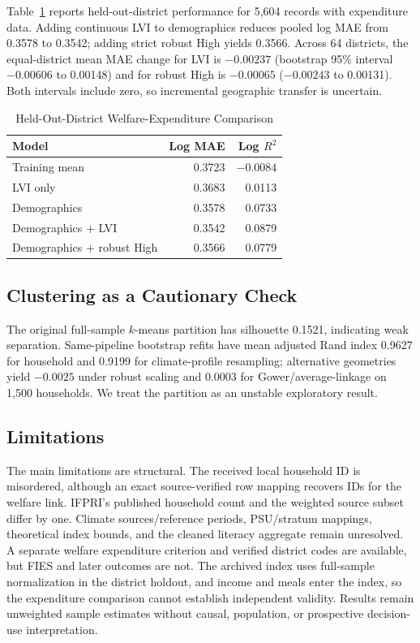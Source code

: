 \documentclass[conference,a4paper]{IEEEtran}
\begin{document}
Table~\ref{tab:welfare} reports held-out-district performance for 5,604 records with expenditure data. Adding continuous LVI to demographics reduces pooled log MAE from 0.3578 to 0.3542; adding strict robust High yields 0.3566. Across 64 districts, the equal-district mean MAE change for LVI is $-0.00237$ (bootstrap 95\% interval $-0.00606$ to 0.00148) and for robust High is $-0.00065$ ($-0.00243$ to 0.00131). Both intervals include zero, so incremental geographic transfer is uncertain.

\begin{table}[t]
\caption{Held-Out-District Welfare-Expenditure Comparison}
\label{tab:welfare}
\centering
\begin{tabular}{lrr}
\toprule
Model & Log MAE & Log $R^2$\\
\midrule
Training mean & 0.3723 & $-0.0084$\\
LVI only & 0.3683 & 0.0113\\
Demographics & 0.3578 & 0.0733\\
Demographics + LVI & 0.3542 & 0.0879\\
Demographics + robust High & 0.3566 & 0.0779\\
\bottomrule
\end{tabular}
\end{table}

\subsection{Clustering as a Cautionary Check}
The original full-sample $k$-means partition has silhouette 0.1521, indicating weak separation. Same-pipeline bootstrap refits have mean adjusted Rand index 0.9627 for household and 0.9199 for climate-profile resampling; alternative geometries yield $-0.0025$ under robust scaling and 0.0003 for Gower/average-linkage on 1,500 households. We treat the partition as an unstable exploratory result.

\subsection{Limitations}
The main limitations are structural. The received local household ID is misordered, although an exact source-verified row mapping recovers IDs for the welfare link. IFPRI's published household count and the weighted source subset differ by one. Climate sources/reference periods, PSU/stratum mappings, theoretical index bounds, and the cleaned literacy aggregate remain unresolved. A separate welfare expenditure criterion and verified district codes are available, but FIES and later outcomes are not. The archived index uses full-sample normalization in the district holdout, and income and meals enter the index, so the expenditure comparison cannot establish independent validity. Results remain unweighted sample estimates without causal, population, or prospective decision-use interpretation.
\end{document}

